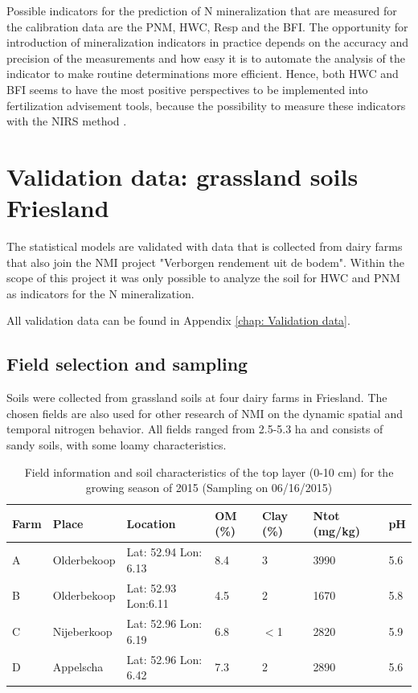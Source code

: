 \documentclass[10pt,twoside,dutch,english]{report}
\begin{document}
Possible indicators for the prediction of N mineralization that are measured for the calibration data are the PNM, HWC, Resp and the BFI. The opportunity for introduction of mineralization indicators in practice depends on the accuracy and precision of the measurements and how easy it is to automate the analysis of the indicator to make routine determinations more efficient. Hence, both HWC and BFI seems to have the most positive perspectives to be implemented into fertilization advisement tools, because the possibility to measure these indicators with the NIRS method \citep{Hanegraaf2008, Vasques2009}. 



\section{Validation data: grassland soils Friesland}
The statistical models are validated with data that is collected from dairy farms that also join the NMI project "Verborgen rendement uit de bodem". Within the scope of this project it was only possible to analyze the soil for HWC and PNM as indicators for the N mineralization. 

All validation data can be found in Appendix \autoref{chap: Validation data}.

\subsection{Field selection and sampling}
Soils were collected from grassland soils at four dairy farms in Friesland. The chosen fields are also used for other research of NMI on the dynamic spatial and temporal nitrogen behavior. All fields ranged from 2.5-5.3 ha and consists of sandy soils, with some loamy characteristics. %

\begin{table}[ht] %
	\caption{Field information and soil characteristics of the top layer (0-10 cm) for the growing season of 2015 (Sampling on 06/16/2015) }
	\footnotesize 
	\renewcommand{\arraystretch}{1.2}
	
	
	\begin{tabu} to %
		\toprule	\rowfont{\bfseries}
		Farm & Place & Location & OM (\%) & Clay (\%) & Ntot (mg/kg) & pH \\  \midrule
		A & Olderbekoop & Lat: 52.94 Lon: 6.13 & 8.4 & 3 & 3990& 5.6 \\
		B & Olderbekoop& Lat: 52.93 Lon:6.11 & 4.5& 2& 1670& 5.8\\
		C & Nijeberkoop & Lat: 52.96 Lon: 6.19 & 6.8& $<$1& 2820& 5.9\\
		D & Appelscha & Lat: 52.96 Lon: 6.42 & 7.3& 2& 2890& 5.6\\		 \bottomrule
	\end{tabu}
	
\end{table}
\end{document}
